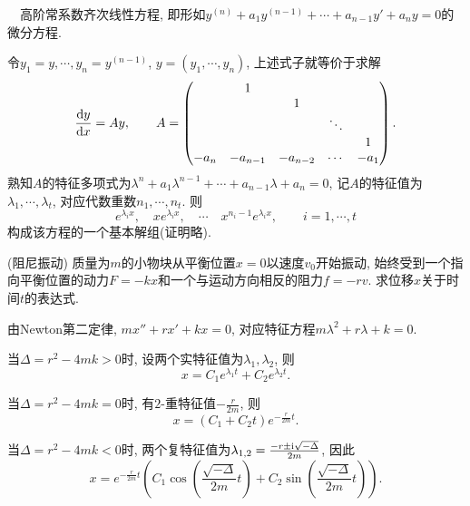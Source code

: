 ~~高阶常系数齐次线性方程, 即形如$y^{(n)}+a_1y^{(n-1)} + \cdots + a_{n-1}y'+a_ny=0$的微分方程. 

令$y_1=y,\cdots ,y_n=y^{(n-1)}$, $y=(y_1,\cdots ,y_n)$, 上述式子就等价于求解$$\frac{\mathop{}\!\mathrm{d} y}{\mathop{}\!\mathrm{d} x} = Ay,\qquad A=\begin{pmatrix}
  & 1 &  &  &   \\
  &  & 1 &  &   \\
  &  &  & \ddots    & \\
  &  &  &    & 1\\
 -a_n & -a_{n-1} & -a_{n-2} & \cdots  & -a_1
\end{pmatrix}.$$
熟知$A$的特征多项式为$\lambda ^n+a_1\lambda ^{n-1} + \cdots + a_{n-1}\lambda +a_n=0$, 记$A$的特征值为$\lambda _1,\cdots ,\lambda _t$, 对应代数重数$n_1,\cdots ,n_t$. 则$$e^{\lambda _ix},\quad xe^{\lambda _ix}, \quad \cdots \quad x^{n_i-1}e^{\lambda _ix},\qquad i=1,\cdots ,t$$
构成该方程的一个基本解组(证明略). 

\begin{example}
	(阻尼振动) 质量为$m$的小物块从平衡位置$x=0$以速度$v_0$开始振动, 始终受到一个指向平衡位置的动力$F=-kx$和一个与运动方向相反的阻力$f=-r v$. 求位移$x$关于时间$t$的表达式. 
\end{example}
\begin{solution}
	由Newton第二定律, $mx''+rx'+kx=0$, 对应特征方程$m\lambda ^2+r\lambda +k=0$. 
	
	当$\Delta = r^2-4mk>0$时, 设两个实特征值为$\lambda _1,\lambda _2$, 则$$x=C_1e^{\lambda _1t}+C_2e^{\lambda _2t}.$$
	
	当$\Delta = r^2-4mk=0$时, 有$2$-重特征值$-\frac{r}{2m}$, 则$$x=(C_1+C_2t)e^{-\frac{r}{2m}t}.$$
	
	当$\Delta = r^2-4mk<0$时, 两个复特征值为$\lambda_{1,2}=\frac{-r\pm \mathrm{i} \sqrt{-\Delta}}{2m}$, 因此$$x=e^{-\frac{r}{2m}t}\left( C_1\cos \left( \frac{\sqrt{-\Delta}}{2m}t \right)+C_2\sin \left( \frac{\sqrt{-\Delta}}{2m}t \right) \right).$$
\end{solution}










































